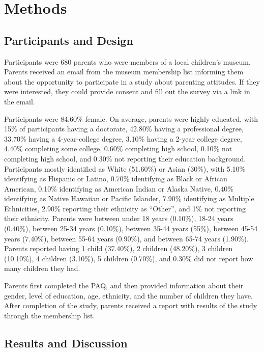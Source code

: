 \documentclass[floatsintext,man]{apa6}
\theoremstyle{definition}
\theoremstyle{definition}
\theoremstyle{definition}
\theoremstyle{remark}
\begin{document}
\section{Methods}\label{methods}

\subsection{Participants and Design}\label{participants-and-design}

Participants were 680 parents who were members of a local children's
museum. Parents received an email from the museum membership list
informing them about the opportunity to participate in a study about
parenting attitudes. If they were interested, they could provide consent
and fill out the survey via a link in the email.

Participants were 84.60\% female. On average, parents were highly
educated, with 15\% of participants having a doctorate, 42.80\% having a
professional degree, 33.70\% having a 4-year-college degree, 3.10\%
having a 2-year college degree, 4.40\% completing some college, 0.60\%
completing high school, 0.10\% not completing high school, and 0.30\%
not reporting their education background. Participants mostly identified
as White (51.60\%) or Asian (30\%), with 5.10\% identifying as Hispanic
or Latino, 0.70\% identifying as Black or African American, 0.10\%
identifying as American Indian or Alaska Native, 0.40\% identifying as
Native Hawaiian or Pacific Islander, 7.90\% identifying as Multiple
Ethnicities, 2.90\% reporting their ethnicity as \enquote{Other}, and
1\% not reporting their ethnicity. Parents were between under 18 years
(0.10\%), 18-24 years (0.40\%), between 25-34 years (0.10\%), between
35-44 years (55\%), between 45-54 years (7.40\%), between 55-64 years
(0.90\%), and between 65-74 years (1.90\%). Parents reported having 1
child (37.40\%), 2 children (48.20\%), 3 children (10.10\%), 4 children
(3.10\%), 5 children (0.70\%), and 0.30\% did not report how many
children they had.

Parents first completed the PAQ, and then provided information about
their gender, level of education, age, ethnicity, and the number of
children they have. After completion of the study, parents received a
report with results of the study through the membership list.

\subsection{Results and Discussion}\label{results-and-discussion}
\end{document}

